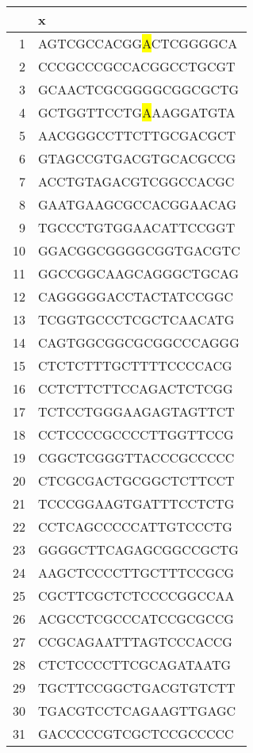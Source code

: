 \documentclass[letterpaper,12pt]{article}
\numberwithin{equation}{appendix}
\begin{document}
\noindent

{\small {
\begin{table}[ht]
\centering
\begin{tabular}{rl}
  \hline
 & x \\ 
  \hline
    1 & AGTCGCCACGG{\colorbox{yellow}{A}}CTCGGGGCA \\ 
    2 & CCCGCCCGCCACGGCCTGCGT \\ 
    3 & GCAACTCGCGGGGCGGCGCTG \\ 
    4 & GCTGGTTCCTG{\colorbox{yellow}{A}}AAGGATGTA \\ 
    5 & AACGGGCCTTCTTGCGACGCT \\ 
    6 & GTAGCCGTGACGTGCACGCCG \\ 
    7 & ACCTGTAGACGTCGGCCACGC \\ 
    8 & GAATGAAGCGCCACGGAACAG \\ 
    9 & TGCCCTGTGGAACATTCCGGT \\ 
  10 & GGACGGCGGGGCGGTGACGTC \\ 
  11 & GGCCGGCAAGCAGGGCTGCAG \\ 
  12 & CAGGGGGACCTACTATCCGGC \\ 
  13 & TCGGTGCCCTCGCTCAACATG \\ 
  14 & CAGTGGCGGCGCGGCCCAGGG \\ 
  15 & CTCTCTTTGCTTTTCCCCACG \\ 
  16 & CCTCTTCTTCCAGACTCTCGG \\ 
  17 & TCTCCTGGGAAGAGTAGTTCT \\ 
  18 & CCTCCCCGCCCCTTGGTTCCG \\ 
  19 & CGGCTCGGGTTACCCGCCCCC \\ 
  20 & CTCGCGACTGCGGCTCTTCCT \\ 
  21 & TCCCGGAAGTGATTTCCTCTG \\ 
  22 & CCTCAGCCCCCATTGTCCCTG \\ 
  23 & GGGGCTTCAGAGCGGCCGCTG \\ 
  24 & AAGCTCCCCTTGCTTTCCGCG \\ 
  25 & CGCTTCGCTCTCCCCGGCCAA \\ 
  26 & ACGCCTCGCCCATCCGCGCCG \\ 
  27 & CCGCAGAATTTAGTCCCACCG \\ 
  28 & CTCTCCCCTTCGCAGATAATG \\ 
  29 & TGCTTCCGGCTGACGTGTCTT \\ 
  30 & TGACGTCCTCAGAAGTTGAGC \\ 
  31 & GACCCCCGTCGCTCCGCCCCC \\ 

\end{tabular}
\end{table}}}
\end{document}
